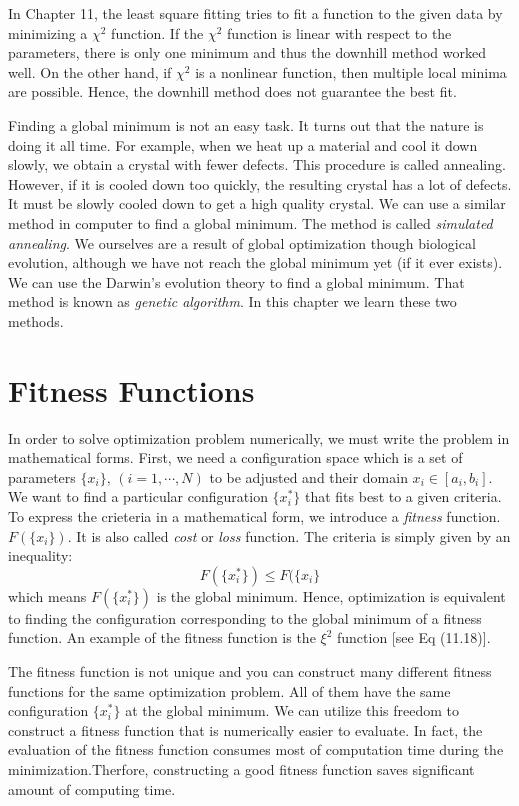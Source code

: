 In Chapter 11, the least square fitting tries to fit a function to the given data by minimizing a $\chi^2$ function.  If the $\chi^2$ function is linear with respect to the parameters, there is only one minimum and thus the downhill method worked well.  On the other hand, if $\chi^2$ is a nonlinear function, then multiple local minima are possible.  Hence, the downhill method does not guarantee the best fit.

Finding a global minimum is not an easy task.  It turns out that the nature is doing it all time.  For example, when we heat up a  material and cool it down slowly, we obtain a crystal with fewer defects.  This procedure is called annealing.  However, if it is cooled down too quickly, the resulting crystal has a lot of defects.  It must be slowly cooled down to get a high quality crystal.  We can use a similar method in computer to find a global minimum.  The method is called \emph{simulated annealing}.  We ourselves are a result of global optimization though biological evolution, although we have not reach the global minimum yet (if it ever exists).   We can use the Darwin's evolution theory to find a global minimum. That method is known as \emph{genetic algorithm}.\cite{genetic_algorithm1,genetic_algorithm2}  In this chapter we learn these two methods.

\section{Fitness Functions}

In order to solve optimization problem numerically, we must write the problem in mathematical forms.  First, we need a configuration space which is a set of parameters $\{x_i\},\,(i=1, \cdots, N)$ to be adjusted and their domain $x_i \in [a_i, b_i]$.  We want to find a particular configuration $\{x_i^*\}$ that fits best to a given criteria. To express the crieteria in a mathematical form, we introduce a \textit{fitness} function. $F(\{x_i\})$.  It is also called \textit{cost} or \textit{loss} function.
The criteria is simply given by an inequality:
\begin{equation}
F(\{x_i^*\}) \le F(\{x_i\}
\end{equation}
which means $F(\{x_i^*\})$ is the global minimum.  Hence,  optimization is equivalent to finding the configuration corresponding to the global minimum of a fitness function.
An example of the fitness function is the $\xi^2$ function [see  Eq (11.18)].  

The fitness function is not unique and you can construct many different fitness functions for the same optimization problem.  All of them have the same configuration $\{x_i^*\}$ at the global minimum. We can utilize this freedom to construct a fitness function that is numerically easier to evaluate.  In fact, the evaluation of the fitness function consumes most of computation time during the minimization.Therfore, constructing a good fitness function saves significant amount of computing time.

